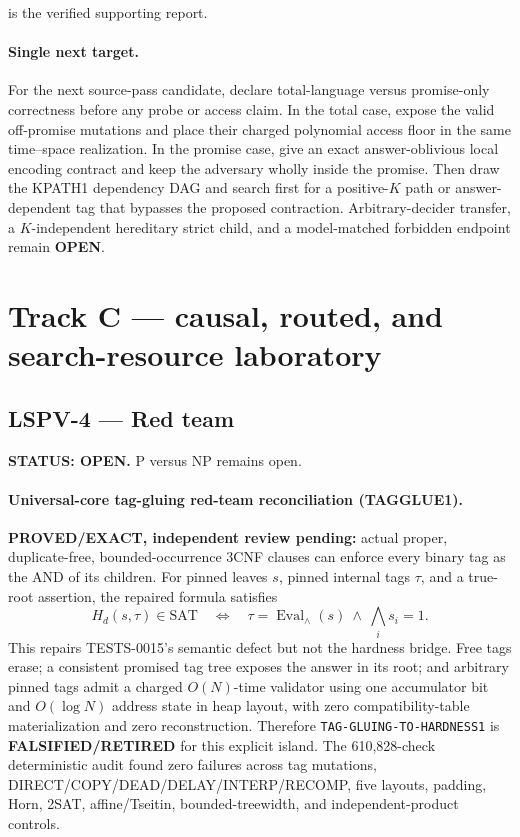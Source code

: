 \documentclass[11pt]{article}
\begin{document}
 is the verified supporting report.

\paragraph{Single next target.}
For the next source-pass candidate, declare total-language versus promise-only correctness before any probe or access claim.  In the total case, expose the valid off-promise mutations and place their charged polynomial access floor in the same time--space realization.  In the promise case, give an exact answer-oblivious local encoding contract and keep the adversary wholly inside the promise.  Then draw the KPATH1 dependency DAG and search first for a positive-\(K\) path or answer-dependent tag that bypasses the proposed contraction.  Arbitrary-decider transfer, a \(K\)-independent hereditary strict child, and a model-matched forbidden endpoint remain \textbf{OPEN}.

\section{Track C --- causal, routed, and search-resource laboratory}

\subsection{LSPV-4 --- Red team}
\textbf{STATUS: OPEN.} P versus NP remains open.

\paragraph{Universal-core tag-gluing red-team reconciliation (TAGGLUE1).}
\textbf{PROVED/EXACT, independent review pending:} actual proper,
duplicate-free, bounded-occurrence 3CNF clauses can enforce every binary tag
as the AND of its children.  For pinned leaves \(s\), pinned internal tags
\(\tau\), and a true-root assertion, the repaired formula satisfies
\[
 H_d(s,\tau)\in\mathrm{SAT}
 \quad\Longleftrightarrow\quad
 \tau=\operatorname{Eval}_{\wedge}(s)
 \ \land\ \bigwedge_i s_i=1.
\]
This repairs TESTS-0015's semantic defect but not the hardness bridge.  Free
tags erase; a consistent promised tag tree exposes the answer in its root;
and arbitrary pinned tags admit a charged \(O(N)\)-time validator using one
accumulator bit and \(O(\log N)\) address state in heap layout, with zero
compatibility-table materialization and zero reconstruction.  Therefore
\texttt{TAG-GLUING-TO-HARDNESS1} is \textbf{FALSIFIED/RETIRED} for this
explicit island.  The 610,828-check deterministic audit found zero failures
across tag mutations, DIRECT/COPY/DEAD/DELAY/INTERP/RECOMP, five layouts,
padding, Horn, 2SAT, affine/Tseitin, bounded-treewidth, and independent-product
controls.
\end{document}
